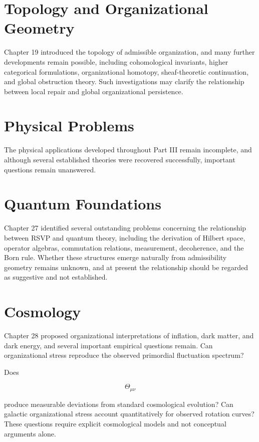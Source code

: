\documentclass[11pt,oneside]{book}
\numberwithin{equation}{chapter}
\theoremstyle{definition}
\theoremstyle{plain}
\begin{document}
\section{Topology and Organizational Geometry}

Chapter 19 introduced the topology of admissible organization, and many further developments remain possible, including cohomological invariants, higher categorical formulations, organizational homotopy, sheaf-theoretic continuation, and global obstruction theory. Such investigations may clarify the relationship between local repair and global organizational persistence.

\section{Physical Problems}

The physical applications developed throughout Part III remain incomplete, and although several established theories were recovered successfully, important questions remain unanswered.

\section{Quantum Foundations}

Chapter 27 identified several outstanding problems concerning the relationship between RSVP and quantum theory, including the derivation of Hilbert space, operator algebras, commutation relations, measurement, decoherence, and the Born rule. Whether these structures emerge naturally from admissibility geometry remains unknown, and at present the relationship should be regarded as suggestive and not established.

\section{Cosmology}

Chapter 28 proposed organizational interpretations of inflation, dark matter, and dark energy, and several important empirical questions remain. Can organizational stress reproduce the observed primordial fluctuation spectrum?

Does

\[
\Theta_{\mu\nu}
\]

produce measurable deviations from standard cosmological evolution? Can galactic organizational stress account quantitatively for observed rotation curves? These questions require explicit cosmological models and not conceptual arguments alone.
\end{document}
